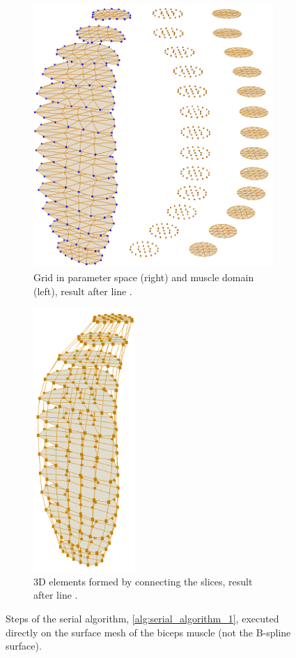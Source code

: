 \begin{figure}
\begin{subfigure}[t]{0.48\textwidth}
    \label{fig:serial_alg_3}%
  \end{subfigure}\\
  \centering%
  \begin{subfigure}[t]{0.49\textwidth}%
    \centering%
    \includegraphics[height=10cm]{images/fiber_creation/serial_alg_4_orange.png}%
    \caption{Grid in parameter space (right) and muscle domain (left), result after line .}%
    \label{fig:serial_alg_4}%
  \end{subfigure}
  \hfill{}
  \begin{subfigure}[t]{0.4\textwidth}%
    \centering%
    \includegraphics[height=10cm]{images/fiber_creation/serial_alg_8_orange.png}%
    \caption{3D elements formed by connecting the slices, result after line .}%
    \label{fig:serial_alg_8}%
  \end{subfigure}
  \caption{Steps of the serial algorithm, \cref{alg:serial_algorithm_1}, executed directly on the surface mesh of the biceps muscle (not the B-spline surface).}%
  \label{fig:serial_alg}%
\end{figure}%
%

